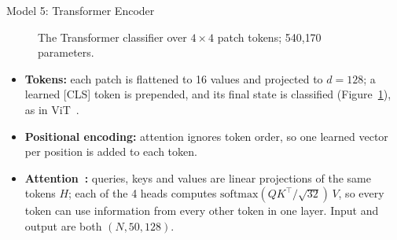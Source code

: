 \begin{frame}{Model 5: Transformer Encoder}
\begin{figure}
{}
\caption{The Transformer classifier over $4 \times 4$ patch tokens; 540{,}170 parameters.}
\label{fig:transformer}
\end{figure}

\vspace{-0.3cm}
\small
\begin{itemize}
    \item \textbf{Tokens:} each patch is flattened to 16 values and projected to $d = 128$; a learned [CLS] token is
          prepended, and its final state is classified (Figure~\ref{fig:transformer}), as in ViT~\cite{dosovitskiy2021image}.
    \item \textbf{Positional encoding:} attention ignores token order, so one learned vector per position is added to each token.
    \item \textbf{Attention~\cite{vaswani2017attention}:} queries, keys and values are linear projections of the same tokens $H$;
          each of the 4 heads computes $\mathrm{softmax}(QK^\top / \sqrt{32})\,V$, so every token can use information from
          every other token in one layer. Input and output are both $(N, 50, 128)$.
\end{itemize}
\end{frame}

